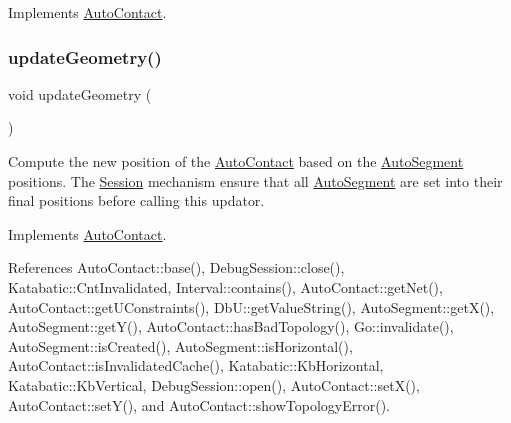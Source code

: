 Implements \hyperlink{classKatabatic_1_1AutoContact_a994371005874f946cc0ac78005d38423}{Auto\+Contact}.

\mbox{\label{classKatabatic_1_1AutoContactTerminal_a3e218f6934c51380fb15d0e2bd380071}} 
\subsubsection{\texorpdfstring{update\+Geometry()}{updateGeometry()}}
{\footnotesize\ttfamily void update\+Geometry (\begin{DoxyParamCaption}{ }\end{DoxyParamCaption})\hspace{0.3cm}{\ttfamily [virtual]}}

Compute the new position of the \hyperlink{classKatabatic_1_1AutoContact}{Auto\+Contact} based on the \hyperlink{classKatabatic_1_1AutoSegment}{Auto\+Segment} positions. The \hyperlink{classKatabatic_1_1Session}{Session} mechanism ensure that all \hyperlink{classKatabatic_1_1AutoSegment}{Auto\+Segment} are set into their final positions before calling this updator. 

Implements \hyperlink{classKatabatic_1_1AutoContact_af6a2454547eeb7f5a519970dcb467e90}{Auto\+Contact}.



References Auto\+Contact\+::base(), Debug\+Session\+::close(), Katabatic\+::\+Cnt\+Invalidated, Interval\+::contains(), Auto\+Contact\+::get\+Net(), Auto\+Contact\+::get\+U\+Constraints(), Db\+U\+::get\+Value\+String(), Auto\+Segment\+::get\+X(), Auto\+Segment\+::get\+Y(), Auto\+Contact\+::has\+Bad\+Topology(), Go\+::invalidate(), Auto\+Segment\+::is\+Created(), Auto\+Segment\+::is\+Horizontal(), Auto\+Contact\+::is\+Invalidated\+Cache(), Katabatic\+::\+Kb\+Horizontal, Katabatic\+::\+Kb\+Vertical, Debug\+Session\+::open(), Auto\+Contact\+::set\+X(), Auto\+Contact\+::set\+Y(), and Auto\+Contact\+::show\+Topology\+Error().

\mbox{\label{classKatabatic_1_1AutoContactTerminal_af5bf1f5e71204ef84346e4e036175431}} 

